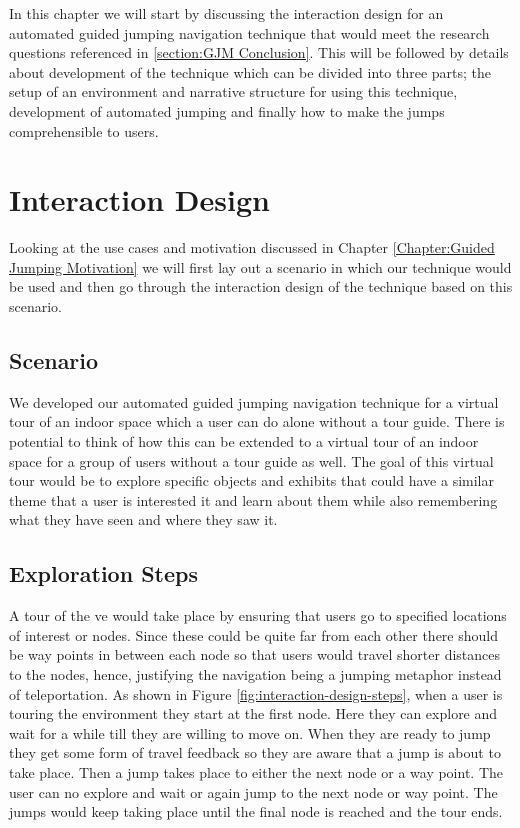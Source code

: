 \label{Chapter:Automated Guided Jumping}
In this chapter we will start by discussing the interaction design for an automated guided jumping navigation technique that would meet the research questions referenced in \ref{section:GJM Conclusion}. This will be followed by details about development of the technique which can be divided into three parts; the setup of an environment and narrative structure for using this technique, development of automated jumping and finally how to make the jumps comprehensible to users. 

\section{Interaction Design}
\label{section AGJ: Interaction Design}
Looking at the use cases and motivation discussed in Chapter \ref{Chapter:Guided Jumping Motivation} we will first lay out a scenario in which our technique would be used and then go through the interaction design of the technique based on this scenario.

\subsection{Scenario}
\label{subsection AGJ ID: Scenario}
We developed our automated guided jumping navigation technique  for a virtual tour of an indoor space which a user can do alone without a tour guide. There is potential to think of how this can be extended to a virtual tour of an indoor space for a group of users without a tour guide as well. The goal of this virtual tour would be to explore specific objects and exhibits that could have a similar theme that a user is interested it and learn about them while also remembering what they have seen and where they saw it. 

\subsection{Exploration Steps}
\label{subsection AGJ ID: Exploration Steps}
A tour of the \acrshort{ve} would take place by ensuring that users go to specified locations of interest or nodes. Since these could be quite far from each other there should be way points in between each node so that users would travel shorter distances to the nodes, hence, justifying the navigation being a jumping metaphor instead of teleportation. As shown in Figure \ref{fig:interaction-design-steps}, when a user is touring the environment they start at the first node. Here they can explore and wait for a while till they are willing to move on. When they are ready to jump they get some form of travel feedback so they are aware that a jump is about to take place. Then a jump takes place to either the next node or a way point. The user can no explore and wait or again jump to the next node or way point. The jumps would keep taking place until the final node is reached and the tour ends. 

